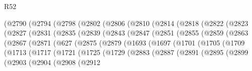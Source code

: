\begin{lexlean}{R52}
\begin{coremodule}
          (@2790
            (@2794
              (@2798
                (@2802
                  (@2806
                    (@2810
                      (@2814
                        (@2818
                          (@2822
                            (@2823
                              (@2827
                                (@2831
                                  (@2835
                                    (@2839
                                      (@2843
                                        (@2847
                                          (@2851
                                            (@2855
                                              (@2859
                                                (@2863
                                                  (@2867
                                                    (@2871
                                                      (@627
                                                        (@2875
                                                          (@2879
                                                            (@1693
                                                              (@1697
                                                                (@1701
                                                                  (@1705
                                                                    (@1709
                                                                      (@1713
                                                                        (@1717
                                                                          (@1721
                                                                            (@1725
                                                                              (@1729
                                                                                (@2883
                                                                                  (@2887
                                                                                    (@2891
                                                                                      (@2895
                                                                                        (@2899
                                                                                          (@2903
                                                                                            (@2904
                                                                                              (@2908
                                                                                                (@2912

\end{coremodule}
\end{lexlean}
